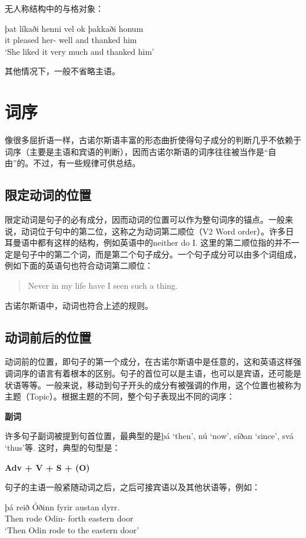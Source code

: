 \begin{enumerate}
          无人称结构中的与格对象：
          \begin{exe}
              \ex \gll þat	líkaði	henni	vel	ok	þakkaði	honum\\
              it	pleased	her-{\dat}	well	and	thanked	him\\
              \trans `She liked it very much and thanked him’
          \end{exe}

          其他情况下，一般不省略主语。

\end{enumerate}

\section{词序}
像很多屈折语一样，古诺尔斯语丰富的形态曲折使得句子成分的判断几乎不依赖于词序（主要是主语和宾语的判断），因而古诺尔斯语的词序往往被当作是“自由”的。不过，有一些规律可供总结。

\subsection{限定动词的位置}
限定动词是句子的必有成分，因而动词的位置可以作为整句词序的锚点。一般来说，动词位于句中的第二位，这称之为动词第二顺位（V2 Word order）。许多日耳曼语中都有这样的结构，例如英语中的neither do I. 这里的第二顺位指的并不一定是句子中的第二个词，而是第二个句子成分。一个句子成分可以由多个词组成，例如下面的英语句也符合动词第二顺位：
\begin{quote}
    Never in my life have I seen such a thing.
\end{quote}
古诺尔斯语中，动词也符合上述的规则。
\subsection{动词前后的位置}
动词前的位置，即句子的第一个成分，在古诺尔斯语中是任意的，这和英语这样强调词序的语言有着根本的区别。句子的首位可以是主语，也可以是宾语，还可能是状语等等。一般来说，移动到句子开头的成分有被强调的作用，这个位置也被称为主题（Topic）。根据主题的不同，整个句子表现出不同的词序：

\textbf{副词}

许多句子副词被提到句首位置，最典型的是þá `then’, nú `now’, síðan `since’, svá `thus’等. 这时，典型的句型是：
\begin{center}
    \textbf{Adv + V + S + (O)}
\end{center}

句子的主语一般紧随动词之后，之后可接宾语以及其他状语等，例如：
\begin{exe}
    \ex \gll
    þá	reið	Óðinn	fyrir	austan	dyrr.\\
    Then	rode	Odin-{\nom}	forth	eastern	door\\
    \trans `Then Odin rode to the eastern door’
\end{exe}

